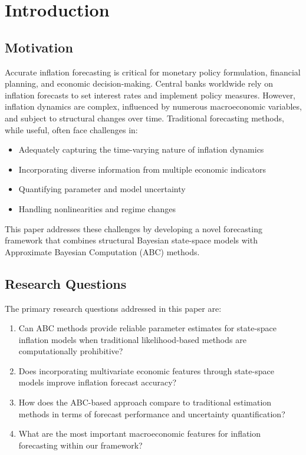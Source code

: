 \section{Introduction}

\subsection{Motivation}

Accurate inflation forecasting is critical for monetary policy formulation, financial planning, and economic decision-making. Central banks worldwide rely on inflation forecasts to set interest rates and implement policy measures. However, inflation dynamics are complex, influenced by numerous macroeconomic variables, and subject to structural changes over time. Traditional forecasting methods, while useful, often face challenges in:

\begin{itemize}
    \item Adequately capturing the time-varying nature of inflation dynamics
    \item Incorporating diverse information from multiple economic indicators
    \item Quantifying parameter and model uncertainty
    \item Handling nonlinearities and regime changes
\end{itemize}

This paper addresses these challenges by developing a novel forecasting framework that combines structural Bayesian state-space models with Approximate Bayesian Computation (ABC) methods.

\subsection{Research Questions}

The primary research questions addressed in this paper are:

\begin{enumerate}
    \item Can ABC methods provide reliable parameter estimates for state-space inflation models when traditional likelihood-based methods are computationally prohibitive?
    \item Does incorporating multivariate economic features through state-space models improve inflation forecast accuracy?
    \item How does the ABC-based approach compare to traditional estimation methods in terms of forecast performance and uncertainty quantification?
    \item What are the most important macroeconomic features for inflation forecasting within our framework?
\end{enumerate}

